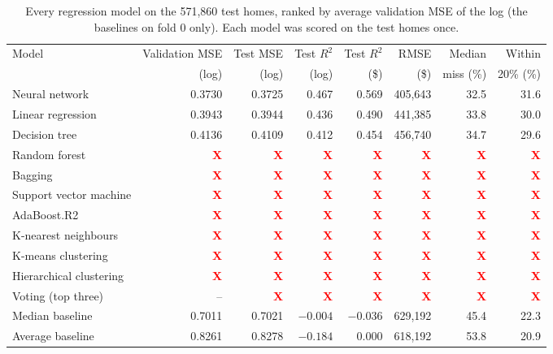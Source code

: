 \documentclass[sigconf,nonacm,10pt]{acmart}
\newcommand{\X}{\textcolor{red}{\textbf{X}}}
\begin{document}
\begin{table}[t]
\caption{Every regression model on the 571,860 test homes, ranked by average validation MSE of the log (the baselines on fold 0 only). Each model was scored on the test homes once.}
\label{tab:test}
\small
\begin{tabular}{@{}lrrrrrrr@{}}
\toprule
Model & Validation MSE & Test MSE & Test $R^2$ & Test $R^2$ & RMSE & Median & Within \\
 & (log) & (log) & (log) & (\$) & (\$) & miss (\%) & 20\% (\%) \\
\midrule
Neural network & 0.3730 & 0.3725 & 0.467 & 0.569 & 405,643 & 32.5 & 31.6 \\
Linear regression & 0.3943 & 0.3944 & 0.436 & 0.490 & 441,385 & 33.8 & 30.0 \\
Decision tree & 0.4136 & 0.4109 & 0.412 & 0.454 & 456,740 & 34.7 & 29.6 \\
Random forest & \X & \X & \X & \X & \X & \X & \X \\
Bagging & \X & \X & \X & \X & \X & \X & \X \\
Support vector machine & \X & \X & \X & \X & \X & \X & \X \\
AdaBoost.R2 & \X & \X & \X & \X & \X & \X & \X \\
K-nearest neighbours & \X & \X & \X & \X & \X & \X & \X \\
K-means clustering & \X & \X & \X & \X & \X & \X & \X \\
Hierarchical clustering & \X & \X & \X & \X & \X & \X & \X \\
Voting (top three) & -- & \X & \X & \X & \X & \X & \X \\
Median baseline & 0.7011 & 0.7021 & $-0.004$ & $-0.036$ & 629,192 & 45.4 & 22.3 \\
Average baseline & 0.8261 & 0.8278 & $-0.184$ & 0.000 & 618,192 & 53.8 & 20.9 \\
\bottomrule
\end{tabular}
\end{table}
\end{document}
